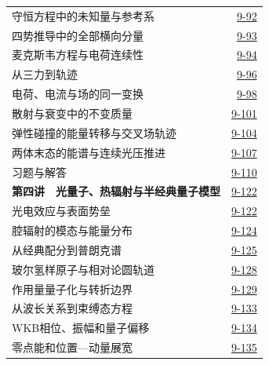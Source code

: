 \begin{longtable}{@{}p{}r@{}}
\hspace{1em}守恒方程中的未知量与参考系&\href{course-page:9:96}{9-92}\\[2pt]
\hspace{1em}四势推导中的全部横向分量&\href{course-page:9:97}{9-93}\\[2pt]
\hspace{1em}麦克斯韦方程与电荷连续性&\href{course-page:9:98}{9-94}\\[2pt]
\hspace{1em}从三力到轨迹&\href{course-page:9:100}{9-96}\\[2pt]
\hspace{1em}电荷、电流与场的同一变换&\href{course-page:9:102}{9-98}\\[2pt]
\hspace{1em}散射与衰变中的不变质量&\href{course-page:9:105}{9-101}\\[2pt]
\hspace{1em}弹性碰撞的能量转移与交叉场轨迹&\href{course-page:9:108}{9-104}\\[2pt]
\hspace{1em}两体末态的能谱与连续光压推进&\href{course-page:9:111}{9-107}\\[2pt]
\hspace{1em}习题与解答&\href{course-page:9:114}{9-110}\\[2pt]
\textbf{第四讲　光量子、热辐射与半经典量子模型}&\href{course-page:9:126}{9-122}\\[2pt]
\hspace{1em}光电效应与表面势垒&\href{course-page:9:126}{9-122}\\[2pt]
\hspace{1em}腔辐射的模态与能量分布&\href{course-page:9:128}{9-124}\\[2pt]
\hspace{1em}从经典配分到普朗克谱&\href{course-page:9:129}{9-125}\\[2pt]
\hspace{1em}玻尔氢样原子与相对论圆轨道&\href{course-page:9:132}{9-128}\\[2pt]
\hspace{1em}作用量量子化与转折边界&\href{course-page:9:133}{9-129}\\[2pt]
\hspace{1em}从波长关系到束缚态方程&\href{course-page:9:137}{9-133}\\[2pt]
\hspace{1em}WKB相位、振幅和量子偏移&\href{course-page:9:138}{9-134}\\[2pt]
\hspace{1em}零点能和位置—动量展宽&\href{course-page:9:139}{9-135}\\[2pt]

\end{longtable}
